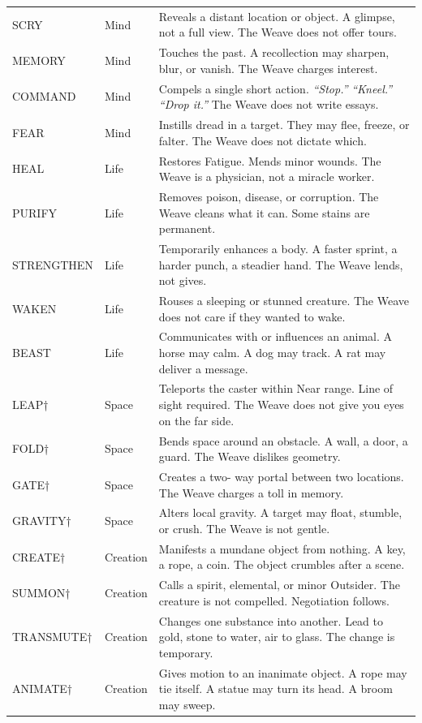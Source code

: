 \begin{longtable}{p{} p{} p{}}
SCRY & Mind & Reveals a distant location or object. A glimpse, not a full view. The Weave does not offer tours. \\
MEMORY & Mind & Touches the past. A recollection may sharpen, blur, or vanish. The Weave charges interest. \\
COMMAND & Mind & Compels a single short action. \emph{``Stop.''} \emph{``Kneel.''} \emph{``Drop it.''} The Weave does not write essays. \\
FEAR & Mind & Instills dread in a target. They may flee, freeze, or falter. The Weave does not dictate which. \\
HEAL & Life & Restores Fatigue. Mends minor wounds. The Weave is a physician, not a miracle worker. \\
PURIFY & Life & Removes poison, disease, or corruption. The Weave cleans what it can. Some stains are permanent. \\
STRENGTHEN & Life & Temporarily enhances a body. A faster sprint, a harder punch, a steadier hand. The Weave lends, not gives. \\
WAKEN & Life & Rouses a sleeping or stunned creature. The Weave does not care if they wanted to wake. \\
BEAST & Life & Communicates with or influences an animal. A horse may calm. A dog may track. A rat may deliver a message. \\
LEAP† & Space & Teleports the caster within Near range. Line of sight required. The Weave does not give you eyes on the far side. \\
FOLD† & Space & Bends space around an obstacle. A wall, a door, a guard. The Weave dislikes geometry. \\
GATE† & Space & Creates a two- way portal between two locations. The Weave charges a toll in memory. \\
GRAVITY† & Space & Alters local gravity. A target may float, stumble, or crush. The Weave is not gentle. \\
CREATE† & Creation & Manifests a mundane object from nothing. A key, a rope, a coin. The object crumbles after a scene. \\
SUMMON† & Creation & Calls a spirit, elemental, or minor Outsider. The creature is not compelled. Negotiation follows. \\
TRANSMUTE† & Creation & Changes one substance into another. Lead to gold, stone to water, air to glass. The change is temporary. \\
ANIMATE† & Creation & Gives motion to an inanimate object. A rope may tie itself. A statue may turn its head. A broom may sweep. \\

\end{longtable}
